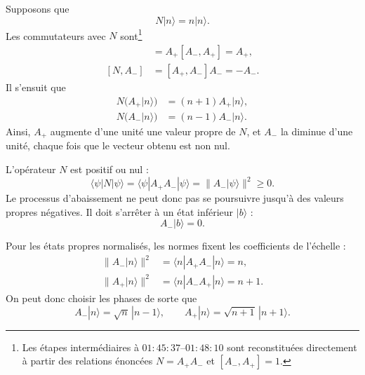 Supposons que
\begin{equation}
N|n\rangle=n|n\rangle.
\end{equation}
Les commutateurs avec \(N\) sont\footnote{Les étapes intermédiaires à \(01{:}45{:}37\)--\(01{:}48{:}10\) sont reconstituées directement à partir des relations énoncées \(N=A_+A_-\) et \([A_-,A_+]=1\).}
\begin{align}
[N,A_+]
&=A_+[A_-,A_+]=A_+, \\
[N,A_-]
&=[A_+,A_-]A_-=-A_-.
\end{align}
Il s’ensuit que
\begin{align}
N\bigl(A_+|n\rangle\bigr)
&=(n+1)A_+|n\rangle, \\
N\bigl(A_-|n\rangle\bigr)
&=(n-1)A_-|n\rangle.
\end{align}
Ainsi, \(A_+\) augmente d’une unité une valeur propre de \(N\), et \(A_-\) la diminue d’une unité, chaque fois que le vecteur obtenu est non nul.

L’opérateur \(N\) est positif ou nul :
\begin{equation}
\langle\psi|N|\psi\rangle
=\langle\psi|A_+A_-|\psi\rangle
=\|A_-|\psi\rangle\|^2
\geq0.
\end{equation}
Le processus d’abaissement ne peut donc pas se poursuivre jusqu’à des valeurs propres négatives. Il doit s’arrêter à un état inférieur \(|b\rangle\) :
\begin{equation}
A_-|b\rangle=0.
\end{equation}

Pour les états propres normalisés, les normes fixent les coefficients de l’échelle :
\begin{align}
\|A_-|n\rangle\|^2
&=\langle n|A_+A_-|n\rangle=n, \\
\|A_+|n\rangle\|^2
&=\langle n|A_-A_+|n\rangle=n+1.
\end{align}
On peut donc choisir les phases de sorte que
\begin{equation}
A_-|n\rangle=\sqrt{n}\,|n-1\rangle,
\qquad
A_+|n\rangle=\sqrt{n+1}\,|n+1\rangle.
\end{equation}

\begin{classroomqa}\end{classroomqa}

